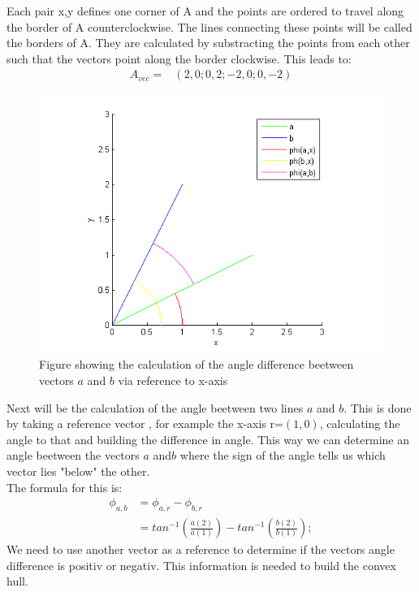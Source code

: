 Each pair x,y defines one corner of A and the points are ordered to travel along the border of A counterclockwise.
The lines connecting these points will be called the borders of A. They are calculated by substracting the points from each other such that the vectors point along the border clockwise. This leads to:
\begin{align*}
A_{vec} = 	&( 2 , 0 ; 0 ,2 ;-2, 0; 0, -2)	
\end{align*}

\begin{figure}[H]
\includegraphics{VectorDegree}
\caption{Figure showing the calculation of the angle difference beetween vectors $a$ and $b$ via reference to x-axis}
 \end{figure}

Next will be the calculation of the angle beetween two lines $a$ and $b$. This is done by taking a reference vector , for example the x-axis r=$(1,0)$, calculating the angle to that and building the difference in angle. This way we can determine an angle beetween the vectors $a$ and$b$ where the sign of the angle tells us which vector lies "below" the other.\\
The formula for this is:
\begin{align*}
  \phi_{a,b} &= \phi_{a,r} - \phi_{b,r}\\
	&= tan^{-1} ( \frac{ a(2) }{  a(1) } ) - tan^{-1} ( \frac{b(2)}{b(1)}); 
\end{align*}
We need to use another vector as a reference to determine if the vectors angle difference is positiv or negativ. This information is needed to build the convex hull.


